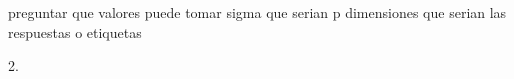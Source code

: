 preguntar que valores puede tomar sigma
que serian p dimensiones
que serian las respuestas o etiquetas


2. 
